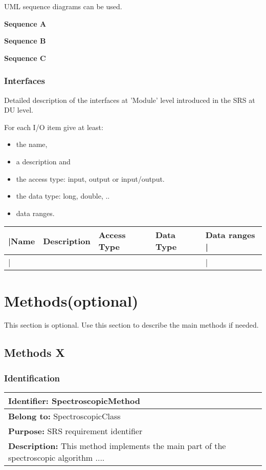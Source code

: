 \documentclass[CUx,lsstdraft,SDD]{lsstdoc}
\begin{document}
UML sequence diagrams can be used.


{\bf Sequence A}

{\bf Sequence B}

{\bf Sequence C}


\subsubsection{Interfaces}

Detailed description of the interfaces at 'Module' level introduced in the SRS at DU level.

      For each I/O item give at least:

      \begin{itemize}
         \item the name,
         \item a description and
         \item the access type: input, output or input/output.
         \item the data type: long, double, ..
         \item data ranges.
      \end{itemize}
      
\begin{longtable}{|p{}|p{}|p{}|p{}|p{}|}\hline
|Name & Description & Access Type & Data Type & Data ranges | \\\hline
|{}&{}&{}&{}&{}|\\\hline
\end{longtable} \normalsize


\section{Methods(optional)}
This section is optional.
Use this section to describe the main methods if needed.

\subsection{Methods X}

\subsubsection{Identification}
\begin{longtable}{|p{}|}\hline
{\bf Identifier:} SpectroscopicMethod \\\hline
{\bf Belong to:} SpectroscopicClass \\\hline
{\bf Purpose:} SRS requirement identifier\\\hline
{\bf Description:} This method implements the main part of the spectroscopic algorithm ....\\\hline
\end{longtable} \normalsize
\end{document}
